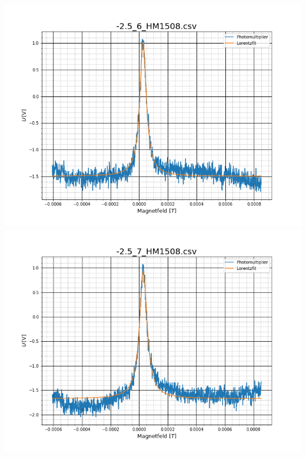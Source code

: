 \begin{center}
\includegraphics[scale=0.3]{Bild/Anhang/Statistik/stat7}
\includegraphics[scale=0.3]{Bild/Anhang/Statistik/stat8}\\




\end{center}
